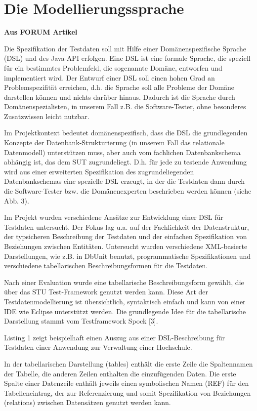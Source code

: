 \section{Die Modellierungssprache}


\textbf{Aus FORUM Artikel}

Die Spezifikation der Testdaten soll mit Hilfe einer Domänenspezifische Sprache (DSL) und des Java-API erfolgen. Eine DSL ist eine formale Sprache, die speziell für ein bestimmtes Problemfeld, die sogenannte Domäne, entworfen und implementiert wird. Der Entwurf einer DSL soll einen hohen Grad an Problemspezifität erreichen, d.h. die Sprache soll alle Probleme der Domäne darstellen können und nichts darüber hinaus. Dadurch ist die Sprache durch Domänenspezialisten, in unserem Fall z.B. die Software-Tester, ohne besonderes Zusatzwissen leicht nutzbar.

Im Projektkontext bedeutet domänenspezifisch, dass die DSL die grundlegenden Konzepte der Datenbank-Strukturierung (in unserem Fall das relationale Datenmodell) unterstützen muss, aber auch vom fachlichen Datenbankschema abhängig ist, das dem SUT zugrundeliegt.  D.h. für jede zu testende Anwendung wird aus einer erweiterten Spezifikation des zugrundeliegenden Datenbankschemas eine spezielle DSL erzeugt, in der die Testdaten dann durch die Software-Tester bzw. die Domänenexperten beschrieben werden können (siehe Abb. 3).

Im Projekt wurden verschiedene Ansätze zur Entwicklung einer DSL für Testdaten untersucht. Der Fokus lag u.a. auf der Fachlichkeit der Datenstruktur, der typsicheren Beschreibung der Testdaten und der einfachen Spezifikation von Beziehungen zwischen Entitäten. Untersucht wurden verschiedene XML-basierte Darstellungen, wie z.B. in DbUnit benutzt, programmatische Spezifikationen und verschiedene tabellarischen Beschreibungsformen für die Testdaten. 

Nach einer Evaluation wurde eine tabellarische Beschreibungsform gewählt, die über das STU Test-Framework genutzt werden kann. Diese Art der Testdatenmodellierung ist übersichtlich, syntaktisch einfach und kann von einer IDE wie Eclipse unterstützt werden. Die grundlegende Idee für die tabellarische Darstellung stammt vom Testframework Spock [3].

Listing 1 zeigt beispielhaft einen Auszug aus einer DSL-Beschreibung für Testdaten einer Anwendung zur Verwaltung einer Hochschule.


In der tabellarischen Darstellung (tables) enthält die erste Zeile die Spaltennamen der Tabelle, die anderen Zeilen enthalten die einzufügenden Daten. Die erste Spalte einer Datenzeile enthält jeweils einen symbolischen Namen (REF) für den Tabelleneintrag, der zur Referenzierung und somit Spezifikation von Beziehungen (relations) zwischen Datensätzen genutzt werden kann.

